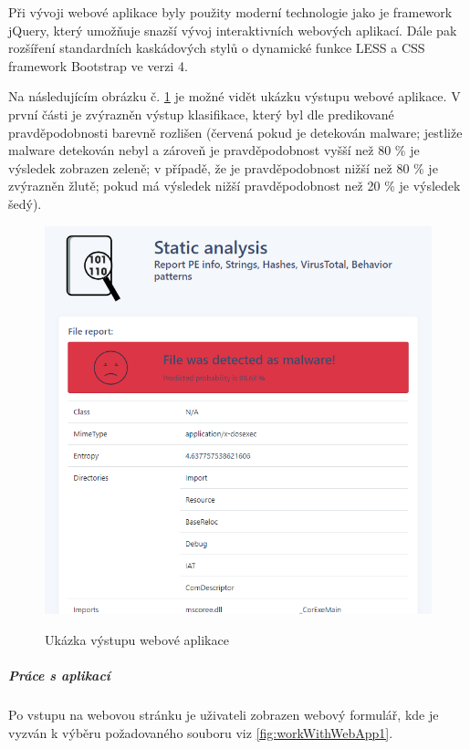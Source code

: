 Při vývoji webové aplikace byly použity moderní technologie jako je framework jQuery, který umožňuje snazší vývoj interaktivních webových aplikací. Dále pak rozšíření standardních kaskádových stylů o dynamické funkce LESS a CSS framework Bootstrap ve verzi 4.

Na následujícím obrázku č. \ref{fig:webAppResult} je možné vidět ukázku výstupu webové aplikace. V první části je zvýrazněn výstup klasifikace, který byl dle predikované pravděpodobnosti barevně rozlišen (červená pokud je detekován malware; jestliže malware detekován nebyl a zároveň je pravděpodobnost vyšší než 80 \% je výsledek zobrazen zeleně; v případě, že je pravděpodobnost nižší než 80 \% je zvýrazněn žlutě; pokud má výsledek nižší pravděpodobnost než 20 \% je výsledek šedý).

\begin{figure}[H]
    \caption{Ukázka výstupu webové aplikace}
    \centering
    \includegraphics[width=135mm,scale=0.5]{Figures/obrazky/web.png}
    \label{fig:webAppResult}
\end{figure}

\subparagraph*{Práce s aplikací}

Po vstupu na webovou stránku je uživateli zobrazen webový formulář, kde je vyzván k výběru požadovaného souboru viz \ref{fig:workWithWebApp1}.

